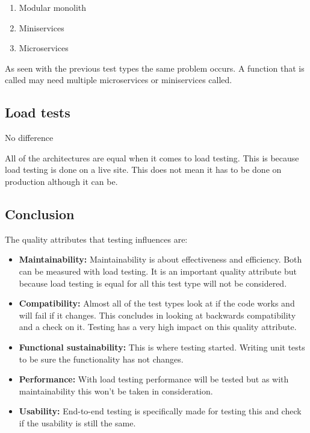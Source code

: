 \begin{enumerate}
        \item Modular monolith
        \item Miniservices
        \item Microservices
\end{enumerate}

As seen with the previous test types the same problem occurs. A function that is called may need multiple microservices or miniservices called.

\subsection{Load tests}

No difference

All of the architectures are equal when it comes to load testing. This is because load testing is done on a live site. This does not mean it has to be done on production although it can be.

\subsection{Conclusion}

The quality attributes that testing influences are:

\begin{itemize}
        \item \textbf{Maintainability:} Maintainability is about effectiveness and efficiency. Both can be measured with load testing. It is an important quality attribute but because load testing is equal for all this test type will not be considered.

        \item \textbf{Compatibility:} Almost all of the test types look at if the code works and will fail if it changes. This concludes in looking at backwards compatibility and a check on it. Testing has a very high impact on this quality attribute.

        \item \textbf{Functional sustainability:} This is where testing started. Writing unit tests to be sure the functionality has not changes.

        \item \textbf{Performance:} With load testing performance will be tested but as with maintainability this won’t be taken in consideration.

        \item \textbf{Usability:} End-to-end testing is specifically made for testing this and check if the usability is still the same.
\end{itemize}

